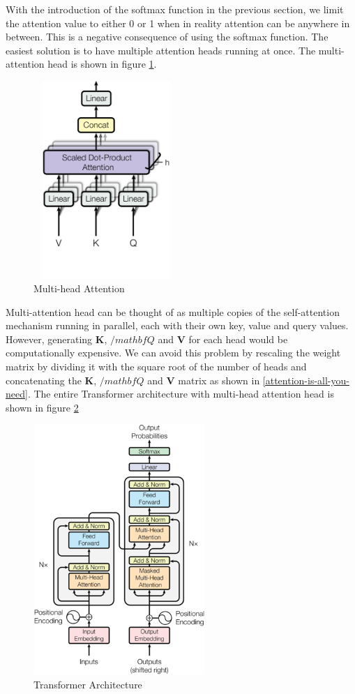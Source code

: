 With the introduction of the softmax function in the previous section, we limit the attention value to either 0 or 1 when in reality attention can be anywhere in between. This is a negative consequence of using the softmax function. The easiest solution is to have multiple attention heads running at once. The multi-attention head is shown in figure \ref{fig:multi-head}.

\begin{figure}[ht]
\includegraphics[width=5.5cm, height=7.5cm]{images/multi-head attention.png}
\centering
\caption{Multi-head Attention}
\label{fig:multi-head}
\end{figure}
\FloatBarrier

Multi-attention head can be thought of as multiple copies of the self-attention mechanism running in parallel, each with their own key, value and query values. However, generating $\mathbf{K}$, $/mathbf{Q}$ and $\mathbf{V}$ for each head would be computationally expensive. We can avoid this problem by rescaling the weight matrix by dividing it with the square root of the number of heads and concatenating the $\mathbf{K}$, $/mathbf{Q}$ and $\mathbf{V}$ matrix as shown in \ref{attention-is-all-you-need}. The entire Transformer architecture with multi-head attention head is shown in figure \ref{fig:transformer-architecture}

\begin{figure}[ht]
\includegraphics[width=6.5cm, height=9.5cm]{images/transformer_architecture.png}
\centering
\caption{Transformer Architecture}
\label{fig:transformer-architecture}
\end{figure}
\FloatBarrier

